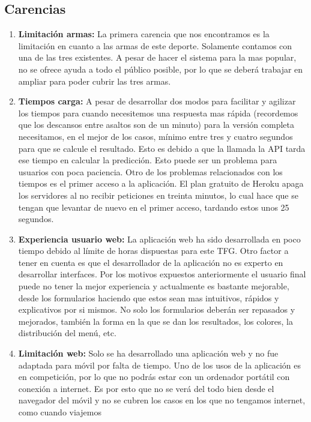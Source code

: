 \subsection{Carencias}
\begin{enumerate}
  \item \textbf{Limitación armas:} La primera carencia que nos encontramos es
    la limitación en cuanto a las armas de este deporte. Solamente contamos
    con una de las tres existentes. A pesar de hacer el sistema para la mas
    popular, no se ofrece ayuda a todo el público posible, por lo que se deberá
    trabajar en ampliar para poder cubrir las tres armas.
  \item \textbf{Tiempos carga:} A pesar de desarrollar dos modos para facilitar
    y agilizar los tiempos para cuando necesitemos una respuesta mas rápida (recordemos
    que los descansos entre asaltos son de un minuto) para la versión completa
    necesitamos, en el mejor de los casos, mínimo entre tres y cuatro segundos
    para que se calcule el resultado. Esto es debido a que la llamada la API
    tarda ese tiempo en calcular la predicción. Esto puede ser un problema para
    usuarios con poca paciencia. Otro de los problemas relacionados con los tiempos
    es el primer acceso a la aplicación. El plan gratuito de Heroku apaga los servidores
    al no recibir peticiones en treinta minutos, lo cual hace que se tengan que levantar
    de nuevo en el primer acceso, tardando estos unos 25 segundos.
  \item \textbf{Experiencia usuario web:} La aplicación web ha sido desarrollada
    en poco tiempo debido al límite de horas dispuestas para este TFG. Otro factor
    a tener en cuenta es que el desarrollador de la aplicación no es experto
    en desarrollar interfaces. Por los motivos expuestos anteriormente el usuario
    final puede no tener la mejor experiencia y actualmente es bastante mejorable,
    desde los formularios haciendo que estos sean mas intuitivos, rápidos y explicativos
    por si mismos. No solo los formularios deberán ser repasados y mejorados, también la forma
    en la que se dan los resultados, los colores, la distribución del menú, etc.
  \item \textbf{Limitación web:} Solo se ha desarrollado una aplicación web y no fue
    adaptada para móvil por falta de tiempo. Uno de los usos de la aplicación es
    en competición, por lo que no podrás estar con un ordenador portátil con conexión
    a internet. Es por esto que no se verá del todo bien desde el navegador del móvil
    y no se cubren los casos en los que no tengamos internet, como cuando viajemos

\end{enumerate}
